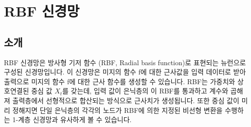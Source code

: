\section{RBF 신경망}  

\subsection{소개}
RBF 신경망은 방사형 기저 함수 (RBF, Radial basis function)로 표현되는 뉴런으로 구성된 신경망입니다. 이 신경망은 미지의 함수 f에 대한 근사값을 입력 데이터로 받아 출력으로 미지의 함수 f에 대한 근사 함수를 생성할 수 있습니다. RBF는 가중치와 상호연결된 중심 값 \(X_{t}\)를 갖는데, 입력 값이 은닉층의 이 RBF를 통과하고 계수와 곱해져 출력층에서 선형적으로 합산되는 방식으로 근사치가 생성됩니다. \cite{574355} 또한 중심 값이 미리 정해지면 단일 은닉층의 각각의 노드가 RBF에 의한 지정된 비선형 변환을 수행하는 1-계층 신경망과 유사하게 볼 수 있습니다. \cite{298229}


